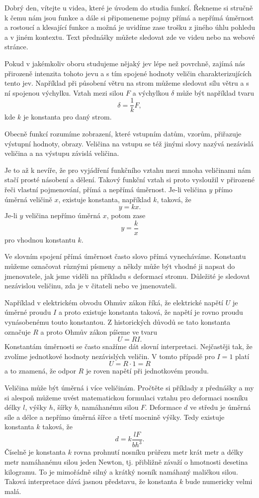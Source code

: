 \documentclass[12pt]{article}
\begin{document}
Dobrý den, vítejte u videa, které je úvodem do studia funkcí. Řekneme si stručně k čemu nám jsou funkce a dále si připomeneme pojmy přímá a nepřímá úměrnost a rostoucí a klesající funkce a možná je uvidíme zase trošku z jiného úhlu pohledu a v jiném kontextu. Text přednášky můžete sledovat zde ve videu nebo na webové stránce.

Pokud v jakémkoliv oboru studujeme nějaký jev lépe než povrchně, zajímá nás přirozeně intenzita tohoto jevu a s tím spojené hodnoty veličin charakterizujících tento jev. Například při působení větru na strom můžeme sledovat sílu větru a s ní spojenou výchylku. Vztah mezi silou $F$ a výchylkou $\delta$ může být například tvaru $$\delta=\frac 1k F,$$ kde $k$ je konstanta pro daný strom.

Obecně funkcí rozumíme zobrazení, které vstupním datům, vzorům, přiřazuje výstupní hodnoty, obrazy. Veličina na vstupu se též jinými slovy nazývá nezávislá veličina a na výstupu závislá veličina.

Je to až k nevíře, že pro vyjádření funkčního vztahu mezi mnoha veličinami nám stačí prosté násobení a dělení. Takový funkční vztah si proto vysloužil v přirozené řeči vlastní pojmenování, přímá a nepřímá úměrnost. Je-li veličina $y$ přímo úměrná veličině $x$, existuje konstanta, například $k$, taková, že $$y=kx.$$ Je-li $y$ veličina nepřímo úměrná $x$, potom zase $$y=\frac kx$$ pro vhodnou konstantu $k$.

Ve slovním spojení přímá úměrnost často slovo přímá vynecháváme. Konstantu můžeme označovat různými písmeny a někdy může být vhodné ji napsat do jmenovatele, jak jsme viděli na příkladu s deformací stromu. Důležité je sledovat nezávislou veličinu, zda je v čitateli nebo ve jmenovateli.

Například v elektrickém obvodu Ohmův zákon říká, že elektrické napětí $U$ je úměrné proudu $I$ a proto existuje konstanta taková, že napětí je rovno proudu vynásobenému touto konstantou. Z historických důvodů se tato konstanta označuje $R$ a proto Ohmův zákon píšeme ve tvaru $$U=RI.$$ Konstantám úměrnosti se často snažíme dát slovní interpretaci. Nejčastěji tak, že zvolíme jednotkové hodnoty nezávislých veličin. V tomto případě pro $I=1$ platí $$U=R\cdot 1=R$$ a to znamená, že odpor $R$ je roven napětí při jednotkovém proudu.

Veličina může být úměrná i více veličinám. Pročtěte si příklady z přednášky a my si alespoň můžeme uvést matematickou formulaci vztahu pro deformaci nosníku délky $l$, výšky $h$, šířky $b$, namáhanému silou $F$. Deformace $d$ ve středu je úměrná síle a délce a nepřímo úměrná šířce a třetí mocnině výšky. Tedy existuje konstanta $k$ taková, že $$d=k\frac {l F}{b h^3}.$$ Číselně je konstanta $k$ rovna prohnutí nosníku průřezu metr krát metr a délky metr namáhanému silou jeden Newton, tj. přibližně závaží o hmotnosti desetina kilogramu. To je mimořádně silný a krátký nosník namáhaný maličkou silou. Taková interpretace dává jasnou představu, že konstanta $k$ bude numericky velmi malá.
\end{document}
